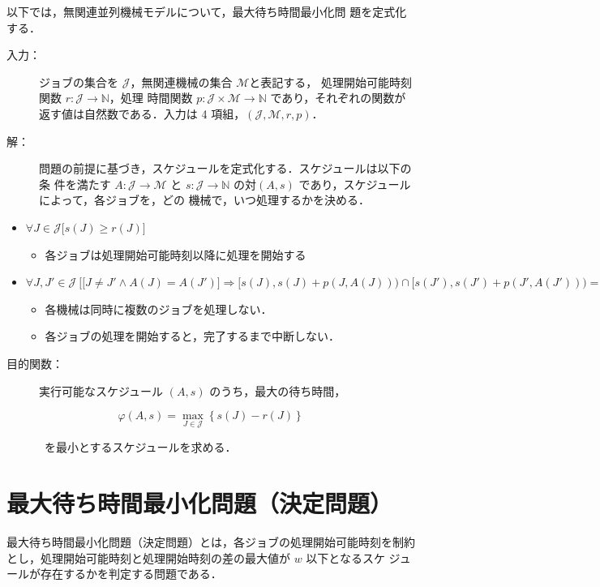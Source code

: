 \documentclass[12pt]{optlab-bachelor}
\begin{document}
以下では，無関連並列機械モデルについて，最大待ち時間最小化問
題を定式化する．

\begin{description}
  \item[入力：] ジョブの集合を $\mathcal{J}$，無関連機械の集合 $\mathcal{M}$と表記する，
  処理開始可能時刻関数 $r : \mathcal{J} \to \mathbb{N}$，処理
  時間関数 $p : \mathcal{J} \times \mathcal{M} \to \mathbb{N}$
  であり，それぞれの関数が返す値は自然数である．入力は 4 項組，$(\mathcal{J}, \mathcal{M}, r, p)$．
  \item[解：] 問題の前提に基づき，スケジュールを定式化する．スケジュールは以下の条
  件を満たす $A : \mathcal{J} \to \mathcal{M}$ と $s : \mathcal{J} \to
  \mathbb{N}$ の対$(A,s)$ であり，スケジュールによって，各ジョブを，どの
  機械で，いつ処理するかを決める．
\end{description}

\begin{itemize}
  \item $\forall J \in \mathcal{J}\big[s(J) \ge r(J) \big]$
  \begin{itemize}
    \item 各ジョブは処理開始可能時刻以降に処理を開始する
  \end{itemize}

  \item {\footnotesize $\forall J, J' \in \mathcal{J}\ \Big[ \big[J\neq J' \land A(J) = A(J')\big] \Rightarrow [s(J), s(J)+p(J,A(J))) \cap[s(J'), s(J')+p(J', A(J'))) = \emptyset \Big]$}
  \begin{itemize}
    \item 各機械は同時に複数のジョブを処理しない．
    \item 各ジョブの処理を開始すると，完了するまで中断しない．
  \end{itemize}
\end{itemize}

\begin{description}
  \item[目的関数：] 実行可能なスケジュール $(A,s)$ のうち，最大の待ち時間，
\end{description}
$$\varphi(A,s) = {\displaystyle \max_{J \in \mathcal{J}} \left\{s(J) -
r(J)\right\}}$$
\begin{description}
  \item[] ~を最小とするスケジュールを求める．
\end{description}

\section{最大待ち時間最小化問題（決定問題）}
最大待ち時間最小化問題（決定問題）とは，各ジョブの処理開始可能時刻を制約
とし，処理開始可能時刻と処理開始時刻の差の最大値が $w$ 以下となるスケ
ジュールが存在するかを判定する問題である．
\end{document}
